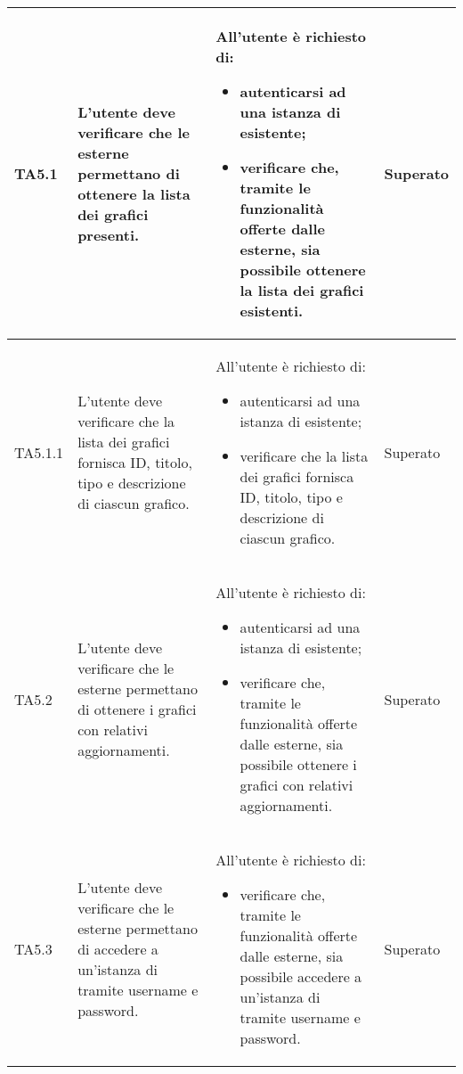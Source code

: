 \begin{longtabu}{| X[0.5] | X | X | X[0.5] |}
	TA5.1 & L'utente  deve verificare che le  esterne permettano di ottenere la lista dei grafici presenti.

		& All'utente  è richiesto di:
		\begin{itemize}
			\item autenticarsi ad una istanza di \projectname{} esistente;
			\item verificare che, tramite le funzionalità offerte dalle  esterne, sia possibile ottenere la lista dei grafici esistenti.
		\end{itemize}
& Superato \\ \hline

	TA5.1.1 & L'utente  deve verificare che la lista dei grafici fornisca ID, titolo, tipo e descrizione di ciascun grafico.
		
		& All'utente  è richiesto di:
		\begin{itemize}
			\item autenticarsi ad una istanza di \projectname{} esistente;
			\item verificare che la lista dei grafici fornisca ID, titolo, tipo e descrizione di ciascun grafico.
		\end{itemize}
& Superato \\ \hline

	TA5.2 & L'utente  deve verificare che le  esterne permettano di ottenere i grafici con relativi aggiornamenti.
		
		& All'utente  è richiesto di:
		\begin{itemize}
			\item autenticarsi ad una istanza di \projectname{} esistente;
			\item verificare che, tramite le funzionalità offerte dalle  esterne, sia possibile ottenere i grafici con relativi aggiornamenti.
		\end{itemize}
& Superato \\ \hline

	TA5.3 & L'utente  deve verificare che le  esterne permettano di accedere a un'istanza di \projectname{} tramite username e password.
		
		& All'utente  è richiesto di:
		\begin{itemize}
			\item verificare che, tramite le funzionalità offerte dalle  esterne, sia possibile accedere a un'istanza di \projectname{} tramite username e password.
		\end{itemize}
& Superato \\ \hline


\end{longtabu}

